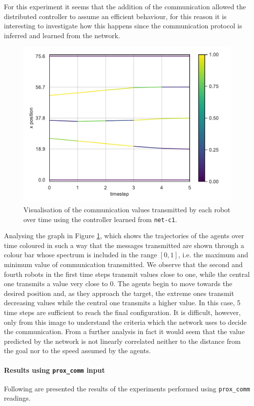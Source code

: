 For this experiment it seems that the addition of the communication allowed the 
distributed controller to assume an efficient behaviour, for this reason it is 
interesting to investigate how this happens since the communication protocol is 
inferred and learned from the network.
\begin{figure}[!htb]
	\centering
	\includegraphics[width=.6\textwidth]{contents/images/net-c1/0/plot-simulation-communication-0}
	\vspace{-0.5cm}
	\caption[Evaluation of the communication learned by 
	\texttt{net-c1}.]{Visualisation of the communication values transmitted by each 
		robot over time using the controller learned from \texttt{net-c1}.}	
	\label{fig:net-c1comm}
\end{figure}
Analysing the graph in Figure \ref{fig:net-c1comm}, which shows the trajectories 
of the agents over time coloured in such a way that the messages transmitted are 
shown through a colour bar whose spectrum is included in the range $[0, 1]$, i.e. 
the maximum and minimum value of communication transmitted. 
We observe that the second and fourth robots in the first time steps transmit 
values close to one, while the central one transmits a value very close to 0. 
The agents begin to move towards the desired position and, as they approach the 
target, the extreme ones transmit decreasing values while the central one 
transmits a higher value. In this case, 5 time steps are sufficient to reach the final 
configuration.
It is difficult, however, only from this image to understand the criteria which the 
network uses to decide the communication.
From a further analysis in fact it would seem that the value predicted by the 
network is not linearly correlated neither to the distance from the goal nor to the 
speed assumed by the agents.

\paragraph*{Results using \texttt{prox\_comm} input}
Following are presented the results of the experiments performed using 
\texttt{prox\_comm} readings. 

